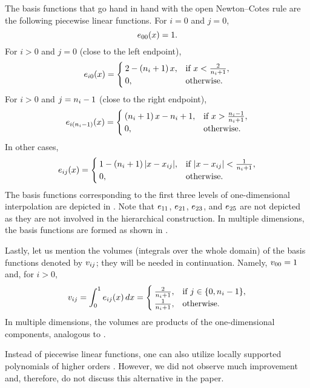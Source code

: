 The basis functions that go hand in hand with the open Newton--Cotes rule are
the following piecewise linear functions. For $i = 0$ and $j = 0$,
\[
  e_{00}(x) = 1.
\]
For $i > 0$ and $j = 0$ (close to the left endpoint),
\[
  e_{i0}(x) = \begin{cases}
    2 - \left( n_i + 1 \right) x, & \text{if } x < \frac{2}{n_i + 1}, \\
    0, & \text{otherwise}.
  \end{cases}
\]
For $i > 0$ and $j = n_i - 1$ (close to the right endpoint),
\[
  e_{i(n_i - 1)}(x) = \begin{cases}
    \left( n_i + 1 \right) x - n_i + 1, & \text{if } x > \frac{n_i - 1}{n_i + 1}, \\
    0, & \text{otherwise}.
  \end{cases}
\]
In other cases,
\[
  e_{ij}(x) = \begin{cases}
    1 - \left( n_i + 1 \right)|x - x_{ij}|, & \text{if } |x - x_{ij}| < \frac{1}{n_i + 1}, \\
    0, & \text{otherwise}.
  \end{cases}
\]
The basis functions corresponding to the first three levels of one-dimensional
interpolation are depicted in . Note that $e_{11}$, $e_{21}$,
$e_{23}$, and $e_{25}$ are not depicted as they are not involved in the
hierarchical construction. In multiple dimensions, the basis functions are
formed as shown in .


Lastly, let us mention the volumes (integrals over the whole domain) of the
basis functions denoted by $v_{ij}$; they will be needed in continuation.
Namely, $v_{00} = 1$ and, for $i > 0$,
\begin{equation} \elab{volume}
  \w_{ij} = \int_0^1 \e_{ij}(\x) \, \d\x = \begin{cases}
    \frac{2}{\n_i + 1}, & \text{if } j \in \{ 0, \n_i - 1 \}, \\
    \frac{1}{\n_i + 1}, & \text{otherwise}.
  \end{cases}
\end{equation}
In multiple dimensions, the volumes are products of the one-dimensional
components, analogous to .

\begin{remark}
Instead of piecewise linear functions, one can also utilize locally supported
polynomials of higher orders \cite{jakeman2012}. However, we did not observe
much improvement and, therefore, do not discuss this alternative in the paper.
\end{remark}
